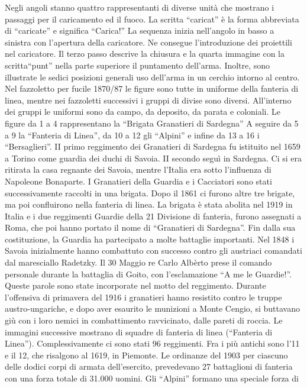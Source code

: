 Negli angoli stanno quattro rappresentanti di diverse unità che mostrano
i passaggi per il caricamento ed il fuoco. La scritta ``caricat'' è la
forma abbreviata di ``caricate'' e significa ``Carica!'' La sequenza
inizia nell'angolo in basso a sinistra con l'apertura della caricatore.
Ne consegue l'introduzione dei proiettili nel caricatore. Il terzo passo
descrive la chiusura e la quarta immagine con la scritta``punt'' nella
parte superiore il puntamento dell'arma. Inoltre, sono illustrate le
sedici posizioni generali uso dell'arma in un cerchio intorno al centro.
Nel fazzoletto per fucile 1870/87 le figure sono tutte in uniforme della
fanteria di linea, mentre nei fazzoletti successivi i gruppi di divise
sono diversi. All'interno dei gruppi le uniformi sono da campo, da
deposito, da parata e coloniali. Le figure da 1 a 4 rappresentano la
``Brigata Granatieri di Sardegna'' A seguire da 5 a 9 la ``Fanteria di
Linea'', da 10 a 12 gli ``Alpini'' e infine da 13 a 16 i
``Bersaglieri''. II primo reggimento dei Granatieri di Sardegna fu
istituito nel 1659 a Torino come guardia dei duchi di Savoia. II secondo
seguì in Sardegna. Ci si era ritirata la casa regnante dei Savoia,
mentre l'Italia era sotto l'influenza di Napoleone Bonaparte. I
Granatieri della Guardia e i Cacciatori sono stati successivamente
raccolti in una brigata. Dopo il 1861 ci furono altre tre brigate, ma
poi confluirono nella fanteria di linea. La brigata è stata abolita nel
1919 in Italia e i due reggimenti Guardie della 21 Divisione di
fanteria, furono assegnati a Roma, che poi hanno portato il nome di
``Granatieri di Sardegna''. Fin dalla sua costituzione, la Guardia ha
partecipato a molte battaglie importanti. Nel 1848 i Savoia inizialmente
hanno combattuto con successo contro gli austriaci comandati dal
maresciallo Radetzky. Il 30 Maggio re Carlo Albèrto prese il comando
personale durante la battaglia di Goito, con l'esclamazione ``A me le
Guardie!''. Queste parole sono state incorporate nel motto del
reggimento. Durante l'offensiva di primavera del 1916 i granatieri hanno
resistito contro le truppe austro-ungariche, e dopo aver esaurito le
munizioni a Monte Cengio, si buttavano giù con i loro nemici in
combattimento ravvicinato, dalle pareti di roccia. Le immagini
successive mostrano di squadre di fanteria di linea (``Fanteria di
Linea''). Complessivamente ci sono stati 96 reggimenti. Fra i più
antichi sono l'11 e il 12, che risalgono al 1619, in Piemonte. Le
ordinanze del 1903 per ciascuno delle dodici corpi di armata
dell'esercito, prevedevano 27 battaglioni di fanteria con una forza
totale di 31.000 uomini. Gli ``Alpini'' formano una speciale forza di
